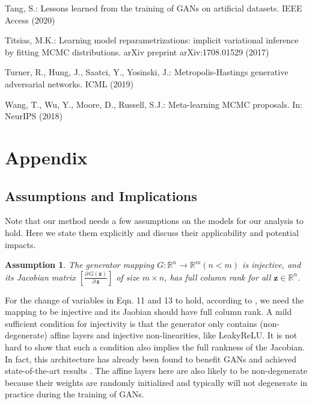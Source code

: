 \documentclass[runningheads]{llncs}
\newtheorem{assumption}{Assumption}
\newcommand{\bz}{\mathbf{z}}
\newcommand{\bbR}{\mathbb{R}}
\newcommand{\<}{\left\langle}
\renewcommand{\>}{\right\rangle}
\begin{document}
\begin{thebibliography}{10}
  Tang, S.: Lessons learned from the training of {GANs} on artificial datasets. IEEE Access (2020)
    
  Titsias, M.K.: Learning model reparametrizations: implicit variational
    inference by fitting {MCMC} distributions. arXiv preprint arXiv:1708.01529
    (2017)
  
  Turner, R., Hung, J., Saatci, Y., Yosinski, J.: {Metropolis-Hastings}
    generative adversarial networks. ICML  (2019)
  
  Wang, T., Wu, Y., Moore, D., Russell, S.J.: Meta-learning {MCMC} proposals. In:
    NeurIPS (2018)
  
  \end{thebibliography}  

  



\appendix
\section{Appendix}

\subsection{Assumptions and Implications}

Note that our method needs a few assumptions on the models for our analysis to hold. Here we state them explicitly and discuss their applicability and potential impacts.

\begin{assumption}
The generator mapping $G:\bbR^n\to\bbR^m (n<m)$ is injective, and its Jacobian matrix $\left[\frac{\partial\,G(\bz)}{\partial\,\bz}\right]$ of size $m\times n$, has full column rank for all $\bz\in\bbR^n$.
\end{assumption}

For the change of variables in Eqn. 11 and 13 to hold, according to \cite{ben1999change}, we need the mapping to be injective and its Jaobian should have full column rank. A mild sufficient condition for injectivity is that the generator only contains (non-degenerate) affine layers and injective non-linearities, like LeakyReLU. It is not hard to show that such a condition also implies the full rankness of the Jacobian. In fact, this architecture has already been found to benefit GANs and achieved state-of-the-art results \cite{tang2020lessons}. The affine layers here are also likely to be non-degenerate because their weights are randomly initialized and typically will not degenerate in practice during the training of GANs.
\end{document}

